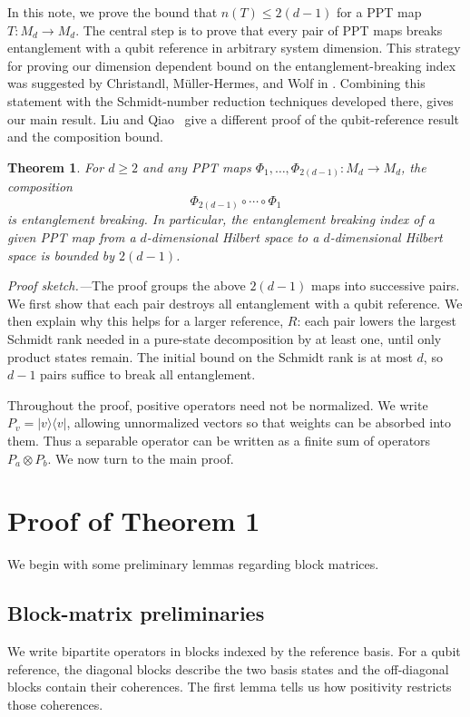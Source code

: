 \documentclass[aps,prl,reprint,superscriptaddress,longbibliography,raggedbottom]{revtex4-2}
\newtheorem{theorem}{Theorem}
\newcommand{\ket}[1]{\lvert #1\rangle}
\newcommand{\bra}[1]{\langle #1\rvert}
\begin{document}
In this note, we prove the bound that $n(T) \leq 2(d-1)$ for a PPT map $T: M_d \to M_d$. The central
step is to prove that every pair of PPT maps breaks entanglement with a
qubit reference in arbitrary system dimension. This strategy for proving our dimension dependent bound on the entanglement-breaking index was suggested by Christandl, M\"uller-Hermes, and Wolf in \cite{CMHW19}. Combining this statement
with the Schmidt-number reduction techniques developed there, gives our main result.
Liu and Qiao~\cite{LiuQiao26} give a different proof of the qubit-reference
result and the composition bound.




\begin{theorem}\label{thm:main}
For $d\ge2$ and any PPT maps
$\Phi_1,\ldots,\Phi_{2(d-1)}:M_d\to M_d$, the composition
\begin{equation}\label{eq:main}
\Phi_{2(d-1)}\circ\cdots\circ\Phi_1
\end{equation}
is entanglement breaking. In particular, the entanglement breaking index of a given PPT map from a $d$-dimensional Hilbert space to a $d$-dimensional Hilbert space is bounded by $2(d-1)$. 
\end{theorem}

\emph{Proof sketch.---}The proof groups the above $2(d-1)$ maps into successive pairs. We first show that each
pair destroys all entanglement with a qubit reference. We then explain
why this helps for a larger reference, $R$: each pair lowers the largest
Schmidt rank needed in a pure-state decomposition by at least one,
until only product states remain. The initial bound on the Schmidt rank is at most $d$, so
$d-1$ pairs suffice to break all entanglement.

Throughout the proof, positive operators need not be normalized. We
write $P_v=\ket v\bra v$, allowing unnormalized vectors so that weights
can be absorbed into them. Thus a separable operator can be written as
a finite sum of operators $P_a\otimes P_b$. We now turn to the main proof. 

\section{Proof of Theorem 1}
We begin with some preliminary lemmas regarding block matrices.

\subsection{Block-matrix preliminaries}
We write bipartite operators in blocks indexed by the reference basis.
For a qubit reference, the diagonal blocks describe the two basis
states and the off-diagonal blocks contain their coherences. The first
lemma tells us how positivity restricts those coherences.
\end{document}
